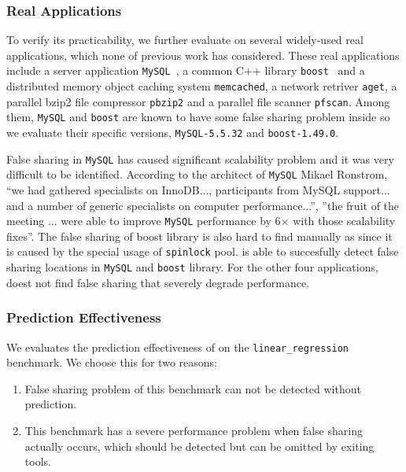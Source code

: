 \subsubsection{Real Applications}
To verify its practicability, we further evaluate  
on several widely-used real applications, which none of previous work has considered.  
These real applications include a server application \texttt{MySQL}~\cite{mysql}, 
a common C++ library \texttt{boost}~\cite{libfalsesharing} 
and a distributed memory object caching system \texttt{memcached}, a network retriver \texttt{aget}, 
a parallel bzip2 file compressor \texttt{pbzip2} and a parallel file scanner \texttt{pfscan}.
Among them, \texttt{MySQL} and \texttt{boost} are known to have some false sharing problem inside 
so we evaluate their specific versions, \texttt{MySQL-5.5.32} and
\texttt{boost-1.49.0}.

False sharing in \texttt{MySQL} has caused significant scalability problem and
it was very difficult to be identified. 
According to the architect of \texttt{MySQL} Mikael Ronstrom, ``we had gathered specialists on 
InnoDB..., participants from MySQL support... and a number of generic specialists on 
computer performance...'', ''the fruit of the meeting ... were able to 
improve \texttt{MySQL} performance by 6$\times$ with those scalability fixes''. 
The false sharing of boost library is also hard to find manually 
as since it is caused by the special usage of \texttt{spinlock} pool. 
 is able to succesfully detect false sharing locations
in \texttt{MySQL} and \texttt{boost} library. 
For the other four applications,  doest not find false sharing that
severely degrade performance.

\subsubsection{Prediction Effectiveness}
\label{sec:predicteval}

We evaluates the prediction effectiveness of  on the \texttt{linear\_regression} benchmark.
We choose this for two reasons:
\begin{enumerate}
\item
False sharing problem of this benchmark can not be detected without prediction. 

\item
This benchmark has a severe performance problem when false sharing actually occurs, which should be 
detected but can be omitted by exiting tools.
\end{enumerate}


